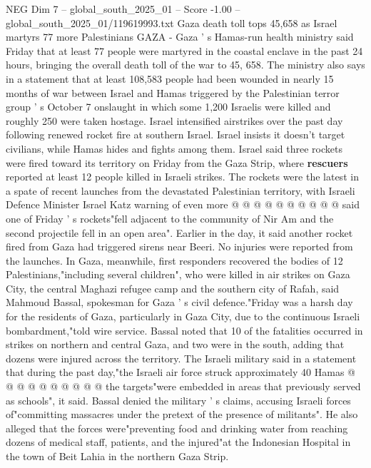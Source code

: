 \begin{textsample}{NEG Dim 7 – global\_south\_2025\_01 – Score -1.00 – global\_south\_2025\_01/119619993.txt}  \label{ex:f7_neg_115}
Gaza death toll tops 45,658 as Israel martyrs 77 more Palestinians GAZA - Gaza ' s Hamas-run health ministry said Friday that at least 77 people were martyred in the coastal enclave in the past 24 hours, bringing the overall death toll of the war to 45, 658.
The ministry also says in a statement that at least 108,583 people had been wounded in nearly 15 months of war between Israel and Hamas triggered by the Palestinian terror group ' s October 7 onslaught in which some 1,200 Israelis were killed and roughly 250 were taken hostage.
Israel intensified airstrikes over the past day following renewed rocket fire at southern Israel.
Israel insists it doesn't target civilians, while Hamas hides and fights among them.
Israel said three rockets were fired toward its territory on Friday from the Gaza Strip, where \textbf{rescuers} reported at least 12 people killed in Israeli strikes.
The rockets were the latest in a spate of recent launches from the devastated Palestinian territory, with Israeli Defence Minister Israel Katz warning of even more @ @ @ @ @ @ @ @ @ @ said one of Friday ' s rockets"fell adjacent to the community of Nir Am and the second projectile fell in an open area".
Earlier in the day, it said another rocket fired from Gaza had triggered sirens near Beeri.
No injuries were reported from the launches.
In Gaza, meanwhile, first responders recovered the bodies of 12 Palestinians,"including several children", who were killed in air strikes on Gaza City, the central Maghazi refugee camp and the southern city of Rafah, said Mahmoud Bassal, spokesman for Gaza ' s civil defence."Friday was a harsh day for the residents of Gaza, particularly in Gaza City, due to the continuous Israeli bombardment,"told wire service.
Bassal noted that 10 of the fatalities occurred in strikes on northern and central Gaza, and two were in the south, adding that dozens were injured across the territory.
The Israeli military said in a statement that during the past day,"the Israeli air force struck approximately 40 Hamas @ @ @ @ @ @ @ @ @ @ the targets"were embedded in areas that previously served as schools", it said.
Bassal denied the military ' s claims, accusing Israeli forces of"committing massacres under the pretext of the presence of militants".
He also alleged that the forces were"preventing food and drinking water from reaching dozens of medical staff, patients, and the injured"at the Indonesian Hospital in the town of Beit Lahia in the northern Gaza Strip.

\end{textsample}
